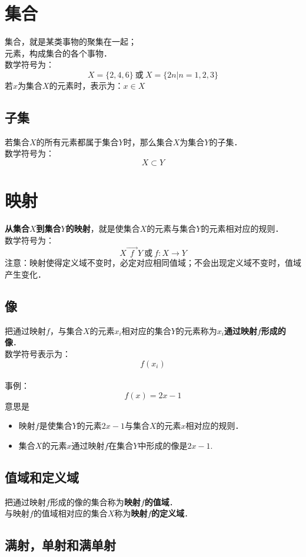 \documentclass[12pt]{article}
\begin{document}
\begin{CJK}{UTF8}{gbsn}
\section{集合}
集合，就是某类事物的聚集在一起；\\
元素，构成集合的各个事物．\\
数学符号为：
$$X = \lbrace 2,4,6 \rbrace\ \text{或}\ X = \lbrace 2n|n=1,2,3 \rbrace$$
若$x$为集合$X$的元素时，表示为：$x \in X$
\subsection{子集}
若集合$X$的所有元素都属于集合$Y$时，那么集合$X$为集合$Y$的子集．\\
数学符号为：
$$X \subset Y$$

\section{映射}
\textbf{从集合$X$到集合$Y$的映射}，就是使集合$X$的元素与集合$Y$的元素相对应的规则．\\
数学符号为：
$$X\overrightarrow{\ \ f\ \ }Y\ \text{或}\ f: X\longrightarrow Y$$
注意：映射使得定义域不变时，必定对应相同值域；不会出现定义域不变时，值域产生变化．
\subsection{像}
把通过映射$f$，与集合$X$的元素$x_i$相对应的集合$Y$的元素称为\textbf{$x_i$通过映射$f$形成的像}．\\
数学符号表示为：$$f(x_i)$$
\paragraph{}
事例：
$$f(x)=2x-1$$
意思是
\begin{itemize}
\item 映射$f$是使集合$Y$的元素$2x-1$与集合$X$的元素$x$相对应的规则．
\item 集合$X$的元素$x$通过映射$f$在集合$Y$中形成的像是$2x-1$.
\end{itemize}
\subsection{值域和定义域}
把通过映射$f$形成的像的集合称为\textbf{映射$f$的值域}．\\
与映射$f$的值域相对应的集合$X$称为\textbf{映射$f$的定义域}．
\subsection{满射，单射和满单射}

\end{CJK}
\end{document}
